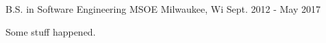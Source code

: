 

\begin{cventries}

  \cventry
    {B.S. in Software Engineering} %
    {MSOE} %
    {Milwaukee, Wi} %
    {Sept. 2012 - May 2017} %
    {
      \begin{cvitems} %
        \item {Some stuff happened.}
      \end{cvitems}
    }

\end{cventries}
